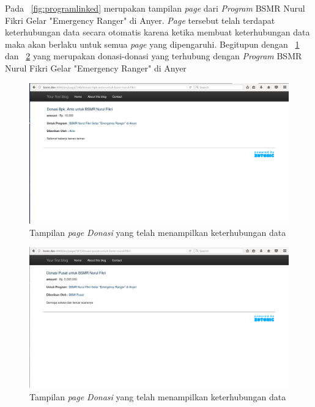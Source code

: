 Pada \pic~\ref{fig:programlinked} merupakan tampilan \textit{page} dari \textit{Program} BSMR Nurul Fikri Gelar "Emergency Ranger" di Anyer. \textit{Page} tersebut telah terdapat keterhubungan data secara otomatis karena ketika membuat keterhubungan data maka akan berlaku untuk semua \textit{page} yang dipengaruhi. Begitupun dengan \pic~\ref{fig:donationlinked} dan \pic~\ref{fig:donationlinked2} yang merupakan donasi-donasi yang terhubung dengan \textit{Program} BSMR Nurul Fikri Gelar "Emergency Ranger" di Anyer

\begin{figure}
	\centering
	\includegraphics[width=1\textwidth]
	{pics/101-donasi.png}
	\caption{Tampilan \textit{page Donasi} yang telah menampilkan keterhubungan data}
	\label{fig:donationlinked}
\end{figure}
\vspace{-0.3cm}

\begin{figure}
	\centering
	\includegraphics[width=1\textwidth]
	{pics/101-donasi2.png}
	\caption{Tampilan \textit{page Donasi} yang telah menampilkan keterhubungan data}
	\label{fig:donationlinked2}
\end{figure}
\vspace{-0.3cm}

